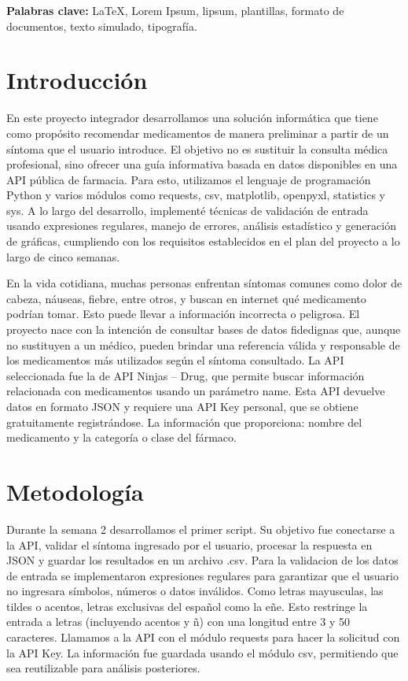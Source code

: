 \documentclass[11pt,letterpaper]{article}
\begin{document}
\smallskip
\noindent\textbf{Palabras clave:} \LaTeX{}, Lorem Ipsum, lipsum, plantillas, formato de documentos, texto simulado, tipografía.



\section*{Introducción}
En este proyecto integrador desarrollamos una solución informática que tiene como propósito recomendar medicamentos de manera preliminar a partir de un síntoma que el usuario introduce. El objetivo no es sustituir la consulta médica profesional, sino ofrecer una guía informativa basada en datos disponibles en una API pública de farmacia.
Para esto, utilizamos el lenguaje de programación Python y varios módulos como requests, csv, matplotlib, openpyxl, statistics y sys. A lo largo del desarrollo, implementé técnicas de validación de entrada usando expresiones regulares, manejo de errores, análisis estadístico y generación de gráficas, cumpliendo con los requisitos establecidos en el plan del proyecto a lo largo de cinco semanas.

En la vida cotidiana, muchas personas enfrentan síntomas comunes como dolor de cabeza, náuseas, fiebre, entre otros, y buscan en internet qué medicamento podrían tomar. Esto puede llevar a información incorrecta o peligrosa. El proyecto nace con la intención de consultar bases de datos fidedignas que, aunque no sustituyen a un médico, pueden brindar una referencia válida y responsable de los medicamentos más utilizados según el síntoma consultado.
La API seleccionada fue la de API Ninjas – Drug, que permite buscar información relacionada con medicamentos usando un parámetro name. Esta API devuelve datos en formato JSON y requiere una API Key personal, que se obtiene gratuitamente registrándose. La información que proporciona: nombre del medicamento y la categoría o clase del fármaco.
\lipsum[1-2]


\section*{Metodología}
Durante la semana 2 desarrollamos el primer script. Su objetivo fue conectarse a la API, validar el síntoma ingresado por el usuario, procesar la respuesta en JSON y guardar los resultados en un archivo .csv. Para la validacion de los datos de entrada se implementaron expresiones regulares para garantizar que el usuario no ingresara símbolos, números o datos inválidos. Como letras mayusculas, las tildes o acentos, letras exclusivas del español como la eñe. Esto restringe la entrada a letras (incluyendo acentos y ñ) con una longitud entre 3 y 50 caracteres. Llamamos a la API con el módulo requests para hacer la solicitud con la API Key. La información fue guardada  usando el módulo csv, permitiendo que sea reutilizable para análisis posteriores.
\end{document}
